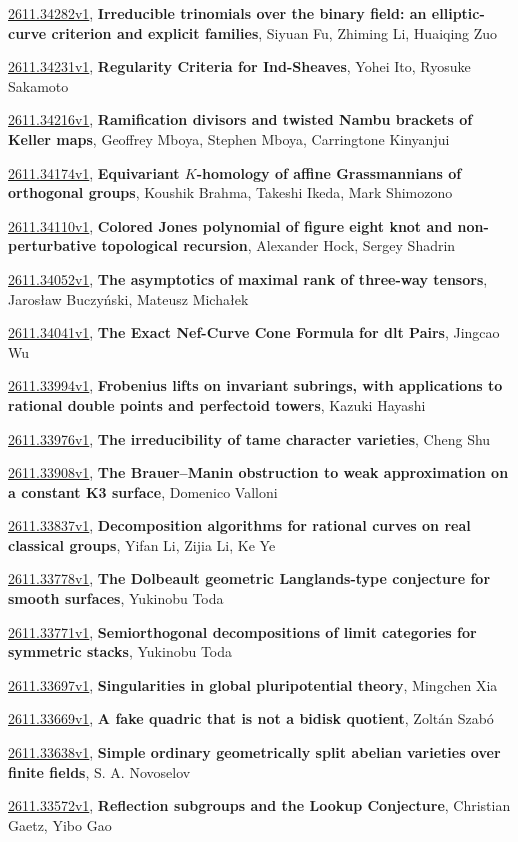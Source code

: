 \documentclass[9pt, a4paper]{article}
\theoremstyle{plain}
\theoremstyle{definition}
\theoremstyle{remark}
\newcommand{\arxiv}[3]{\href{https://arxiv.org/abs/#1}{#1}, \textbf{\textcolor{arxivblue}{#2}}, #3}
\begin{document}
\arxiv{2611.34282v1}{Irreducible trinomials over the binary field: an elliptic-curve criterion and explicit families}{Siyuan Fu, Zhiming Li, Huaiqing Zuo}

\arxiv{2611.34231v1}{Regularity Criteria for Ind-Sheaves}{Yohei Ito, Ryosuke Sakamoto}

\arxiv{2611.34216v1}{Ramification divisors and twisted Nambu brackets of Keller maps}{Geoffrey Mboya, Stephen Mboya, Carringtone Kinyanjui}

\arxiv{2611.34174v1}{Equivariant $K$-homology of affine Grassmannians of orthogonal groups}{Koushik Brahma, Takeshi Ikeda, Mark Shimozono}

\arxiv{2611.34110v1}{Colored Jones polynomial of figure eight knot and non-perturbative topological recursion}{Alexander Hock, Sergey Shadrin}

\arxiv{2611.34052v1}{The asymptotics of maximal rank of three-way tensors}{Jarosław Buczy{ń}ski, Mateusz Michałek}

\arxiv{2611.34041v1}{The Exact Nef-Curve Cone Formula for dlt Pairs}{Jingcao Wu}

\arxiv{2611.33994v1}{Frobenius lifts on invariant subrings, with applications to rational double points and perfectoid towers}{Kazuki Hayashi}

\arxiv{2611.33976v1}{The irreducibility of tame character varieties}{Cheng Shu}

\arxiv{2611.33908v1}{The Brauer--Manin obstruction to weak approximation on a constant K3 surface}{Domenico Valloni}

\arxiv{2611.33837v1}{Decomposition algorithms for rational curves on real classical groups}{Yifan Li, Zijia Li, Ke Ye}

\arxiv{2611.33778v1}{The Dolbeault geometric Langlands-type conjecture for smooth surfaces}{Yukinobu Toda}

\arxiv{2611.33771v1}{Semiorthogonal decompositions of limit categories for symmetric stacks}{Yukinobu Toda}

\arxiv{2611.33697v1}{Singularities in global pluripotential theory}{Mingchen Xia}

\arxiv{2611.33669v1}{A fake quadric that is not a bidisk quotient}{Zoltán Szabó}

\arxiv{2611.33638v1}{Simple ordinary geometrically split abelian varieties over finite fields}{S. A. Novoselov}

\arxiv{2611.33572v1}{Reflection subgroups and the Lookup Conjecture}{Christian Gaetz, Yibo Gao}
\end{document}
